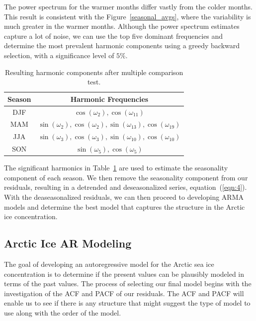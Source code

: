 \documentclass[12pt]{article}
\begin{document}
The power spectrum for the warmer months differ vastly from the colder months. This result is consistent with the Figure~\ref{seasonal_avgs}, where the variability is much greater in the warmer months. Although the power spectrum estimates capture a lot of noise, we can use the top five dominant frequencies and determine the most prevalent harmonic components using a greedy backward selection, with a significance level of $5\%$.

\begin{table}[!htb]
\centering
\begin{tabular}{|c|c|}
\hline
\textbf{Season}       & \textbf{Harmonic Frequencies} \\ \hline\hline
DJF & $\cos(\omega_2), \cos(\omega_{11})$ \\ \hline
MAM & $\sin(\omega_2), \cos(\omega_2), \sin(\omega_{13}), \cos(\omega_{19})$ \\ \hline
JJA & $\sin(\omega_3), \cos(\omega_3), \sin(\omega_{10}), \cos(\omega_{10})$ \\ \hline
SON & $\sin(\omega_5), \cos(\omega_5)$ \\ \hline
\end{tabular}
\caption{Resulting harmonic components after multiple comparison test.}\label{my_harmonics}
\end{table}

The significant harmonics in Table~\ref{my_harmonics} are used to estimate the seasonality component of each season. We then remove the seasonality component from our residuals, resulting in a detrended and deseasonalized series, equation~(\ref{eqn:4}). With the deaseasonalized residuals, we can then proceed to developing ARMA models and determine the best model that captures the structure in the Arctic ice concentration.

\subsection{Arctic Ice AR Modeling}
The goal of developing an autoregressive model for the Arctic sea ice concentration is to determine if the present values can be plausibly modeled in terms of the past values. The process of selecting our final model begins with the investigation of the ACF and PACF of our residuals. The ACF and PACF will enable us to see if there is any structure that might suggest the type of model to use along with the order of the model.
\end{document}

